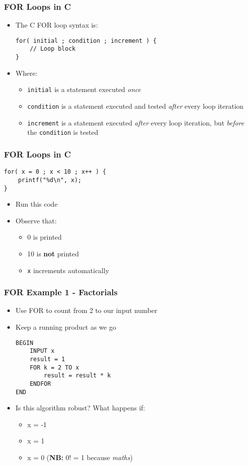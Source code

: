 \documentclass[14pt]{beamer}
\begin{document}
\begin{frame}[fragile]
\frametitle{FOR Loops in C}
\begin{itemize}
\item The C FOR loop syntax is:
\begin{lstlisting}[style=CStyle]
for( initial ; condition ; increment ) {
	// Loop block
}
\end{lstlisting}
\item Where:
	\begin{itemize}
		\item \texttt{initial} is a statement executed \textit{once}
		\item \texttt{condition} is a statement executed and tested \textit{after} every loop iteration
		\item \texttt{increment} is a statement executed \textit{after} every loop iteration, but \textit{before} the \texttt{condition} is tested
	\end{itemize}
\end{itemize}
\end{frame}

\begin{frame}[fragile]
\frametitle{FOR Loops in C}
\begin{lstlisting}[style=CStyle]
for( x = 0 ; x < 10 ; x++ ) {
	printf("%d\n", x);
}
\end{lstlisting}
\begin{itemize}
\item Run this code
\item Observe that:
	\begin{itemize}
		\item 0 is printed
		\item 10 is \textbf{not} printed
		\item \texttt{x} increments automatically
	\end{itemize}

\end{itemize}
\end{frame}


\begin{frame}[fragile]
\frametitle{FOR Example 1 - Factorials}
\begin{itemize}
\item Use FOR to count from 2 to our input number
\item Keep a running product as we go
\begin{lstlisting}[style=pseudo]
BEGIN
	INPUT x
	result = 1
	FOR k = 2 TO x
		result = result * k
	ENDFOR
END
\end{lstlisting}
\item Is this algorithm robust? What happens if:
	\begin{itemize}
		\item x = -1
		\item x = 1
		\item x = 0 (\textbf{NB:} 0! = 1 because \textit{maths})
	\end{itemize}
\end{itemize}
\end{frame}
\end{document}
